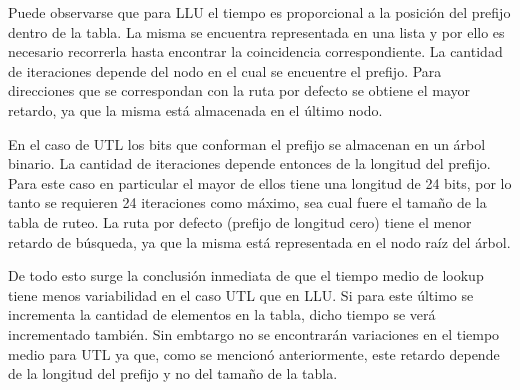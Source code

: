 Puede observarse que para LLU el tiempo es proporcional a la posición del prefijo dentro de la tabla. La misma se encuentra representada en una lista y por ello es necesario recorrerla hasta encontrar la coincidencia correspondiente. La cantidad de iteraciones depende del nodo en el cual se encuentre el prefijo. Para direcciones que se correspondan con la ruta por defecto se obtiene el mayor retardo, ya que la misma está almacenada en el último nodo.

En el caso de UTL los bits que conforman el prefijo se almacenan en un árbol binario. La cantidad de iteraciones depende entonces de la longitud del prefijo. Para este caso en particular el mayor de ellos tiene una longitud de 24 bits, por lo tanto se requieren 24 iteraciones como máximo, sea cual fuere el tamaño de la tabla de ruteo. La ruta por defecto (prefijo de longitud cero) tiene el menor retardo de búsqueda, ya que la misma está representada en el nodo raíz del árbol.

De todo esto surge la conclusión inmediata de que el tiempo medio de lookup tiene menos variabilidad en el caso UTL que en LLU. Si para este último se incrementa la cantidad de elementos en la tabla, dicho tiempo se verá incrementado también. Sin embtargo no se encontrarán variaciones en el tiempo medio para UTL ya que, como se mencionó anteriormente, este retardo depende de la longitud del prefijo y no del tamaño de la tabla.

\newpage
